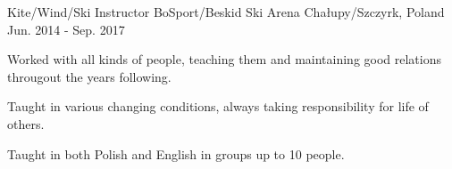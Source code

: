 \begin{cventries}
  \cventry
    {Kite/Wind/Ski Instructor} %
    {BoSport/Beskid Ski Arena} %
    {Chałupy/Szczyrk, Poland} %
    {Jun. 2014 - Sep. 2017} %
    {
      \begin{cvitems} %
        \item { Worked with all kinds of people, teaching them and maintaining good relations througout the years following.}
        \item { Taught in various changing conditions, always taking responsibility for life of others.}
        \item { Taught in both Polish and English in groups up to 10 people.}
      \end{cvitems}
    }

\end{cventries}
